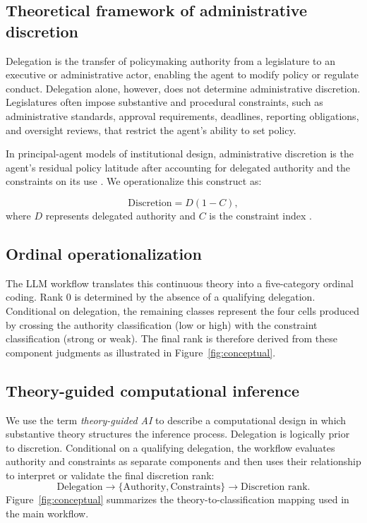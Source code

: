 \documentclass[conference]{IEEEtran}
\begin{document}
\subsection{Theoretical framework of administrative discretion}


Delegation is the transfer of policymaking authority from a legislature to an executive or administrative actor, enabling the agent to modify policy or regulate conduct. Delegation alone, however, does not determine administrative discretion. Legislatures often impose substantive and procedural constraints, such as administrative standards, approval requirements, deadlines, reporting obligations, and oversight reviews, that restrict the agent's ability to set policy.

In principal-agent models of institutional design, administrative discretion is the agent's residual policy latitude after accounting for delegated authority and the constraints on its use \citep{epstein1999delegating, epstein1994administrative}. We operationalize this construct as:


\[
\mathrm{Discretion}=D(1-C),
\]
where \(D\) represents delegated authority and \(C\) is the constraint index \citep{epstein1999delegating,ohalloran2015banking}.

\subsection{Ordinal operationalization}

The LLM workflow translates this continuous theory into a five-category ordinal coding. Rank 0 is determined by the absence of a qualifying delegation. Conditional on delegation, the remaining classes represent the four cells produced by crossing the authority classification (low or high) with the constraint classification (strong or weak). The final rank is therefore derived from these component judgments as illustrated in Figure~\ref{fig:conceptual}.


\subsection{Theory-guided computational inference}

We use the term \emph{theory-guided AI} to describe a computational design in which substantive theory structures the inference process. Delegation is logically prior to discretion. Conditional on a qualifying delegation, the workflow evaluates authority and constraints as separate components and then uses their relationship to interpret or validate the final discretion rank:
\[
\text{Delegation} \rightarrow \{\text{Authority}, \text{Constraints}\} \rightarrow \text{Discretion rank}.
\]
Figure~\ref{fig:conceptual} summarizes the theory-to-classification mapping used in the main workflow.
\end{document}
